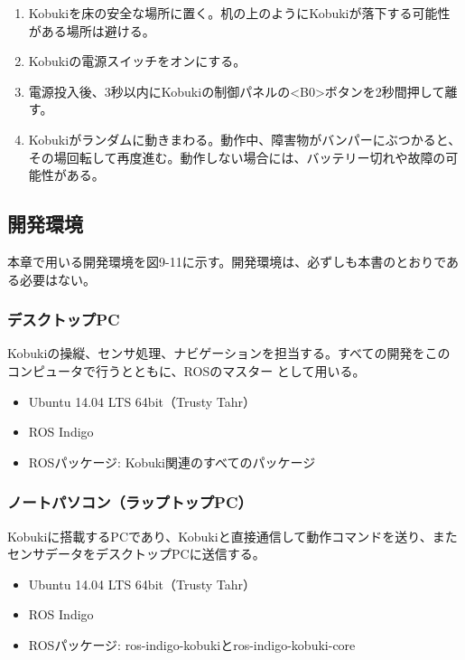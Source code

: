 \begin{itemize}
\begin{enumerate}
\item Kobukiを床の安全な場所に置く。机の上のようにKobukiが落下する可能性がある場所は避ける。
\item Kobukiの電源スイッチをオンにする。
\item 電源投入後、3秒以内にKobukiの制御パネルの<B0>ボタンを2秒間押して離す。
\item Kobukiがランダムに動きまわる。動作中、障害物がバンパーにぶつかると、その場回転して再度進む。動作しない場合には、バッテリー切れや故障の可能性がある。
\end{enumerate}

\subsection{開発環境}

本章で用いる開発環境を図9-11に示す。開発環境は、必ずしも本書のとおりである必要はない。

\subsubsection{デスクトップPC}

Kobukiの操縦、センサ処理、ナビゲーションを担当する。すべての開発をこのコンピュータで行うとともに、ROSのマスター   として用いる。

\begin{itemize}
\item Ubuntu 14.04 LTS 64bit（Trusty Tahr）
\item ROS Indigo
\item ROSパッケージ: Kobuki関連のすべてのパッケージ
\end{itemize}

\subsubsection{ノートパソコン（ラップトップPC）}

Kobukiに搭載するPCであり、Kobukiと直接通信して動作コマンドを送り、またセンサデータをデスクトップPCに送信する。
\begin{itemize}
\item Ubuntu 14.04 LTS 64bit（Trusty Tahr）
\item ROS Indigo
\item ROSパッケージ: ros-indigo-kobukiとros-indigo-kobuki-core
\end{itemize}


\end{itemize}
